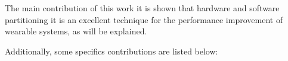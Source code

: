     
    The main contribution of this work it is shown that hardware and software partitioning it is an excellent technique for the performance improvement of wearable systems, as will be explained.
    
    Additionally, some specifics contributions are listed below:
    
